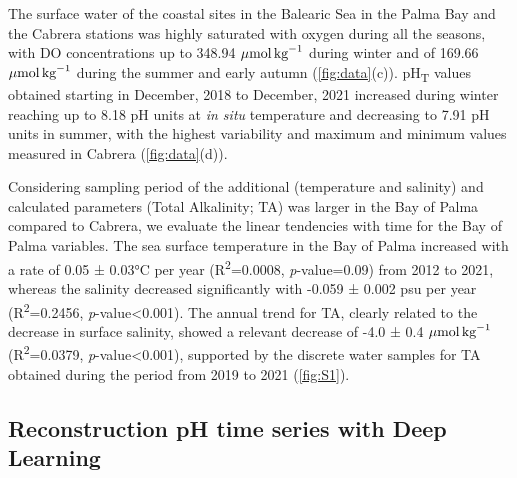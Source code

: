 The surface water of the coastal sites in the Balearic Sea in the Palma Bay
and the Cabrera stations was highly saturated with oxygen during all the
seasons, with DO concentrations up to  348.94 ${\mu \textrm{mol\,kg}^{-1}}$
during winter and of 169.66 ${\mu \textrm{mol\,kg}^{-1}}$ during the summer and
early autumn (\cref{fig:data}(c)). pH\textsubscript{T} values obtained starting
in December, 2018 to December, 2021 increased during winter reaching up to 8.18
pH units at \emph{in situ} temperature and decreasing to 7.91 pH units in
summer, with the highest variability and maximum and minimum values measured in
Cabrera (\cref{fig:data}(d)).

Considering sampling period of the additional (temperature and salinity)
and calculated parameters (Total Alkalinity; TA) was larger in the Bay of Palma
compared to Cabrera, we evaluate the linear tendencies with time for the Bay of
Palma variables. The sea surface temperature in the Bay of Palma increased with
a rate of 0.05 ± 0.03°C per year (R\textsuperscript{2}=0.0008,
\emph{p}-value=0.09) from 2012 to 2021, whereas the salinity decreased
significantly with -0.059 ± 0.002 psu per year (R\textsuperscript{2}=0.2456,
\emph{p}-value<0.001). The annual trend for TA, clearly related to the decrease
in surface salinity, showed a relevant decrease of -4.0 ± 0.4 ${\mu
            \textrm{mol\,kg}^{-1}}$ (R\textsuperscript{2}=0.0379,
\emph{p}-value<0.001),
supported by the discrete water samples for TA obtained during the period from
2019 to 2021  (\cref{fig:S1}).

\subsection{Reconstruction pH time series with Deep Learning}

